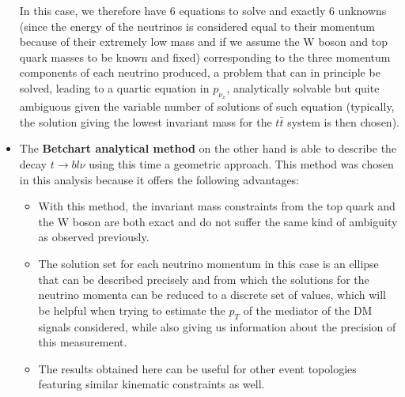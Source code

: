 \documentclass[a4paper, 10pt, openright]{report}
\begin{document}
\begin{itemize}
In this case, we therefore have 6 equations to solve and exactly 6 unknowns (since the energy of the neutrinos is considered equal to their momentum because of their extremely low mass and if we assume the W boson and top quark masses to be known and fixed) corresponding to the three momentum components of each neutrino produced, a problem that can in principle be solved, leading to a quartic equation in $p_{\nu_x}$, analytically solvable but quite ambiguous given the variable number of solutions of such equation (typically, the solution giving the lowest invariant mass for the $t \bar t$ system is then chosen).


\item The \textbf{Betchart analytical method} \cite{Betchart} on the other hand is able to describe the decay $t \rightarrow bl\nu$ using this time a geometric approach. This method was chosen in this analysis because it offers the following advantages:
\begin{itemize}
\item With this method, the invariant mass constraints from the top quark and the W boson are both exact and do not suffer the same kind of ambiguity as observed previously. 


\item The solution set for each neutrino momentum in this case is an ellipse that can be described precisely and from which the solutions for the neutrino momenta can be reduced to a discrete set of values, which will be helpful when trying to estimate the $p_T$ of the mediator of the \ac{DM} signals considered, while also giving us information about the precision of this measurement.
\item The results obtained here can be useful for other event topologies featuring similar kinematic constraints as well.
\end{itemize}


\end{itemize}
\end{document}
